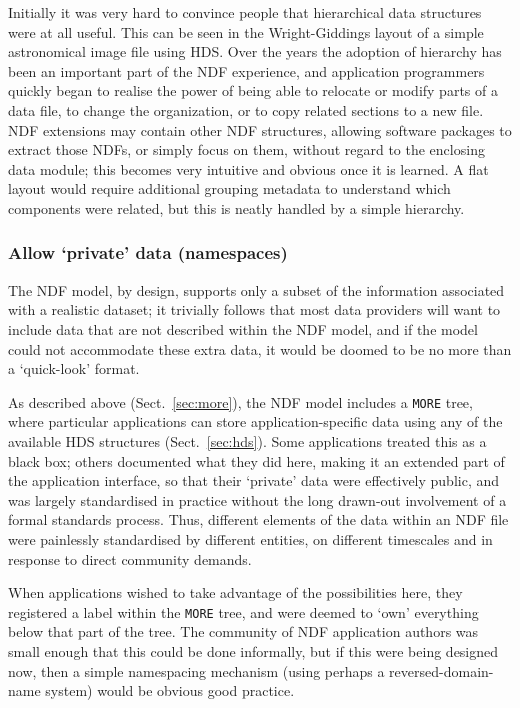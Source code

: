 \documentclass[final,authoryear,5p,times,twocolumn]{elsarticle}
\newcommand*\secref[1]{Sect.~\ref{#1}}
\begin{document}
Initially it was very hard to convince people that hierarchical data
structures were at all useful. This can be seen in the Wright-Giddings
layout of a simple astronomical image file using HDS. Over the years
the adoption of hierarchy has been an important part of the NDF
experience, and application programmers quickly began to realise the power of
being able to relocate or modify parts of a data file,
to change the organization, or to copy related sections to a new file.
NDF extensions may contain other NDF structures, allowing
software packages to extract those NDFs, or simply focus on them,
without regard to the enclosing data module; this becomes very intuitive and
obvious once it is learned. A flat layout would require additional
grouping metadata to understand which components were related, but this
is neatly handled by a simple hierarchy.

\subsubsection{Allow `private' data (namespaces)}

The NDF model, by design, supports only a subset of the information
associated with a realistic dataset; it trivially follows that most
data providers will want to include data that are not described within
the NDF model, and if the model could not accommodate these extra data,
it would be doomed to be no more than a `quick-look' format.

As described above (\secref{sec:more}), the NDF model includes a
\texttt{MORE} tree, where particular applications can store
application-specific data using any of the available HDS structures
(\secref{sec:hds}).  Some applications treated this as a black box;
others documented what they did here, making it an extended part of
the application interface, so that their `private' data were effectively
public, and was largely standardised in practice without the long
drawn-out involvement of a formal standards process.  Thus, different
elements of the data within an NDF file were painlessly standardised
by different entities, on different timescales and in response to
direct community demands.

When applications wished to take advantage of the possibilities here,
they registered a label within the \texttt{MORE} tree, and were deemed
to `own' everything below that part of the tree.  The community of NDF
application authors was small enough that this could be done
informally, but if this were being designed now, then a simple
namespacing mechanism (using perhaps a reversed-domain-name system)
would be obvious good practice.
\end{document}

